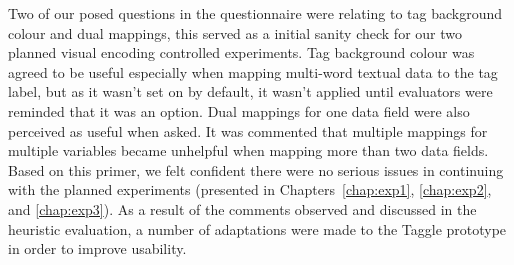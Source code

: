 Two of our posed questions in the questionnaire were relating to tag background colour and dual mappings, this served as a initial sanity check for our two planned visual encoding controlled experiments. Tag background colour was agreed to be useful especially when mapping multi-word textual data to the tag label, but as it wasn't set on by default, it wasn't applied until evaluators were reminded that it was an option. Dual mappings for one data field were also perceived as useful when asked. It was commented that multiple mappings for multiple variables became unhelpful when mapping more than two data fields. Based on this primer, we felt confident there were no serious issues in continuing with the planned experiments (presented in Chapters~\ref{chap:exp1}, \ref{chap:exp2}, and \ref{chap:exp3}). As a result of the comments observed and discussed in the heuristic evaluation, a number of adaptations were made to the Taggle prototype in order to improve usability. 





